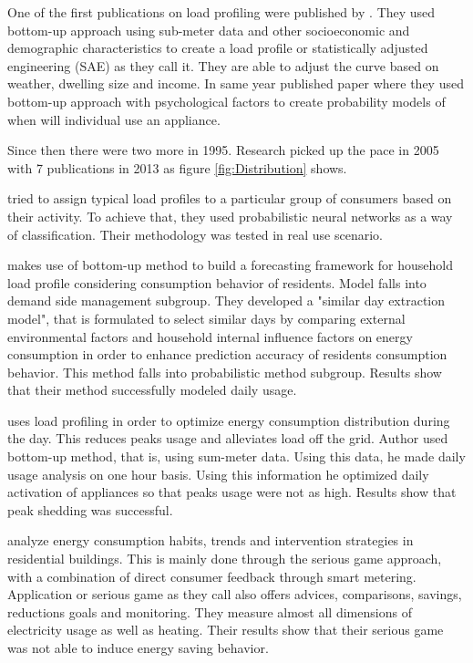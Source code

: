 \documentclass[
11pt, %
english, %
singlespacing, %
headsepline, %
]{MastersDoctoralThesis} %
\begin{document}
One of the first publications on load profiling were published by \cite{TRAIN19851103}.
They used bottom-up approach using sub-meter data and other socioeconomic and demographic characteristics 
to create a load profile or statistically adjusted engineering (SAE) as they call it.
They are able to adjust the curve based on weather, dwelling size and income. 
In same year \cite{WALKER1985} published paper where they used bottom-up approach with psychological factors to create probability models of when will individual use an appliance.

Since then there were two more in 1995. Research picked up the pace in 2005 with 7 publications in 2013 as figure \ref{fig:Distribution} shows.

\cite{GERBEC2005} tried to assign typical load profiles to a particular group of consumers based on their activity. 
To achieve that, they used probabilistic neural networks as a way of classification. Their methodology was tested in real use scenario. 

\cite{Gao2018} makes use of bottom-up method to build a forecasting framework for household
load profile considering consumption behavior of residents. Model falls into demand side management subgroup.
They developed a "similar day extraction model",
that is formulated to select similar days by comparing external environmental factors and household internal 
influence factors on energy consumption in order to enhance prediction accuracy of residents consumption behavior.
This method falls into probabilistic method subgroup. Results show that their method successfully modeled daily usage.

\cite{Chuan2014} uses load profiling in order to optimize energy consumption distribution during the day.
This reduces peaks usage and alleviates load off the grid. Author used bottom-up method, that is, using sum-meter data.
Using this data, he made daily usage analysis on one hour basis. Using this information he optimized daily activation of appliances
so that peaks usage were not as high. Results show that peak shedding was successful. 

\cite{Csoknyai2019} analyze energy consumption habits, trends and intervention strategies in residential buildings.
This is mainly done through the serious game approach, with a combination of direct consumer feedback through smart metering.
Application or serious game as they call also offers advices, comparisons, savings, reductions goals and monitoring.
They measure almost all dimensions of electricity usage as well as heating. Their results show that their serious game was
not able to induce energy saving behavior.
\end{document}

